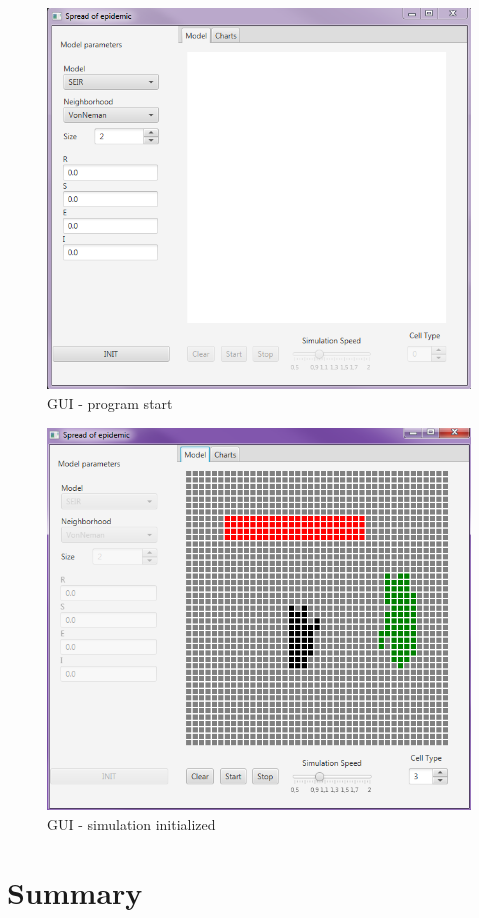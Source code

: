 \documentclass[a4paper, 11pt]{article}
\begin{document}
\begin{figure}[H]
\includegraphics[scale=0.7]{GUI2.PNG} 
\caption{GUI - program start}
\end{figure}
\begin{figure}[H]
\includegraphics[scale=0.7]{GUI3.PNG} 
\caption{GUI - simulation initialized }
\end{figure}
\section{Summary}
%
\printbibliography
\end{document}
